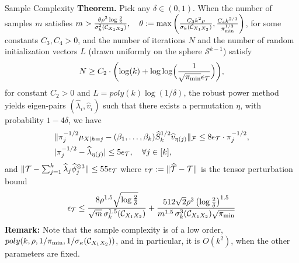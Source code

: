 \documentclass[final,t]{beamer}
\begin{document}
\begin{frame}{}
\begin{columns}[T]
    \begin{column}{0.3\linewidth}
      \begin{block}{Sample Complexity}
      \textbf{Theorem.}
        Pick any $\delta\in (0,1)$. When the number of samples $m$ satisfies
        $m >\frac{\theta\rho^2  \log\frac{2}{\delta}}{\sigma^2_k(\mathcal{C}_{X_1 X_2})},
        \quad \theta:= \max\left(\frac{C_3 k^2 \rho}{\sigma_k( \mathcal{C}_{X_1 X_2})}, \frac{C_4k^{2/3}}{\pi_{\min}^{1/3}}\right)$, for some constants $C_3, C_4>0$, and the number of iterations $N$  and  the number of random initialization vectors $L$  (drawn uniformly on the sphere $\mathcal{S}^{k-1}$) satisfy
        $$
          N \geq C_2 \cdot \biggl( \log(k) + \log\log\Bigl(
         \frac{1}{\sqrt{\pi_{\min}}\epsilon_{{\mathcal{T}}}} \Bigr) \biggr),
        $$
        for constant $C_2>0$ and $L = poly(k) \log(1/\delta)$,  the robust power method yields eigen-pairs $(\widehat \lambda_i, \widehat v_i)$ such that there exists a permutation $\eta$, with probability $1-4\delta$, we have
        \begin{align*}
          &\|\pi^{-1/2}_{j} \mu_{X|h=j}-(\beta_1,\ldots,\beta_k) \widehat  S_k^{1/2} \widehat v_{\eta(j)}\|_{\mathcal{F}} \leq 8 \epsilon_{{\mathcal{T}}} \cdot\pi^{-1/2}_{j}, \\
          &|\pi^{-1/2}_{j}-\widehat \lambda_{\eta(j)}| \leq  5\epsilon_{{\mathcal{T}}}, \quad \forall j \in [k],
        \end{align*}
        and $\|{\mathcal{T}} - \sum\nolimits_{j=1}^k \widehat\lambda_j \widehat\phi_j^{\otimes 3} \| \leq 55\epsilon_{{\mathcal{T}}}$ 
        where $\epsilon_{{\mathcal{T}}}:= \|\widehat {{\mathcal{T}}} - {\mathcal{T}}\|$ is the tensor perturbation bound        
        \begin{align*} 
          \epsilon_{{\mathcal{T}}} \leq
          \frac{8 \rho^{1.5} \sqrt{\log\frac{2}{\delta}}}{\sqrt{m} \, \sigma_k^{1.5}(\mathcal{C}_{X_1 X_2})} 
          + \frac{512 \sqrt{2} \rho^3 \left(\log\frac{2}{\delta}\right)^{1.5}}{m^{1.5} \,\sigma_k^{3}(\mathcal{C}_{X_1 X_2}) \sqrt{\pi_{\min}}}
        \end{align*}
        {\bf Remark:} Note that the sample complexity is of a low order, $poly(k, \rho, 1/\pi_{\min}, 1/\sigma_\kappa(\mathcal{C}_{X_1 X_2}))$, and in particular,  it is $O(k^2)$, when the other parameters are fixed. 
      \end{block}


\end{column}
\end{columns}
\end{frame}
\end{document}
